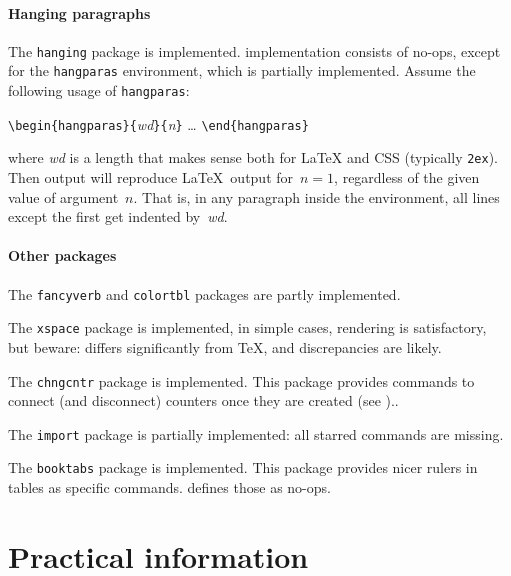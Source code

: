 \subsection{Hanging paragraphs}
%
The \texttt{hanging} package is implemented.
\hevea{} implementation consists of no-ops, except for the
\texttt{hangparas} environment, which is partially implemented.
Assume the following usage of \texttt{hangparas}:
\begin{flushleft}
\verb+\begin{hangparas}{+\textit{wd}\verb+}{+\textit{n}\verb+}+
\quad\ldots
\verb+\end{hangparas}+
\end{flushleft}
where \textit{wd} is a length that makes sense both for \LaTeX{}
and CSS (typically \texttt{2ex}).
Then \html{} output will reproduce \LaTeX~output for~$n=1$, regardless
of the given value of argument~$n$.
That is, in any paragraph inside the environment,
all lines except the first get indented by~\textit{wd}.



\subsection{Other packages}
The \texttt{fancyverb} and \texttt{colortbl}
packages are partly implemented.

The \texttt{xspace} package is implemented,
in simple cases, rendering is satisfactory, but beware: \hevea{}
differs significantly from \TeX{}, and discrepancies are likely.

The \texttt{chngcntr} package is implemented.
This package provides commands to connect (and disconnect) counters
once they are created\ifhevea{} (see
).\else.\fi

The \texttt{import} package is partially implemented:
all starred commands are missing.

The \texttt{booktabs} package is implemented.
This package provides nicer rulers in tables as specific commands.
\hevea{} defines those as no-ops.




\cutend
\setcounter{section}{0}

\part{Practical \label{practical}information}

